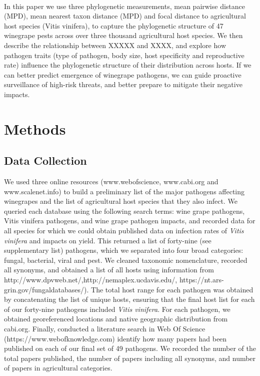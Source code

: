 \documentclass[12pt,letter]{article}
\begin{document}
\paragraph{}In this paper we use three phylogenetic measurements, mean pairwise distance (MPD), mean nearest taxon distance (MPD) and focal distance to agricultural host species (Vitis vinifera), to capture the phylogenetic structure of 47 winegrape pests across over three thousand agricultural host species. We then describe the relationship between XXXXX and XXXX, and explore how pathogen traits (type of pathogen, body size, host specificity and reproductive rate) influence the phylogenetic structure of their distribution across hosts. If we can better predict emergence of winegrape pathogens, we can guide proactive surveillance of high-risk threats, and better prepare to mitigate their negative impacts. %


\section{Methods}
\subsection{Data Collection}
We used three online resources (www.webofscience, www.cabi.org and www.scalenet.info) to build a preliminary list of the major pathogens affecting winegrapes and the list of agricultural host species that they also infect. We queried each database using the following search terms: wine grape pathogens, Vitis vinifera pathogens, and wine grape pathogen impacts, and recorded data for all species for which we could obtain published data on infection rates of \textit{Vitis vinifera} and impacts on yield. This returned a list of forty-nine (see supplementary list) pathogens, which we separated into four broad categories: fungal, bacterial, viral and pest. We cleaned taxonomic nomenclature, recorded all synonyms, and obtained a list of all hosts using information from http://www.dpvweb.net/,http://nemaplex.ucdavis.edu/, https://nt.ars-grin.gov/fungaldatabases/). The total host range for each pathogen was obtained by concatenating the list of unique hosts, ensuring that the final host list for each of our forty-nine pathogens included \textit{Vitis vinifera}. 
For each pathogen, we obtained georeferenced locations and native geographic distribution from cabi.org. Finally, conducted a literature search in Web Of Science (https://www.webofknowledge.com) identify how many papers had been published on each of our final set of 49 pathogens. We recorded the number of the total papers published, the number of papers including all synonyms, and number of papers in agricultural categories.  
\end{document}
